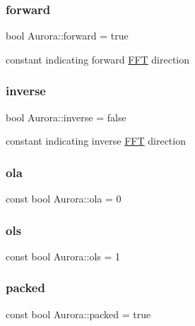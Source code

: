 \mbox{\label{namespace_aurora_a20b1bd3f1b34b8676e26d07718dac352}} 
\subsubsection{\texorpdfstring{forward}{forward}}
{\footnotesize\ttfamily bool Aurora\+::forward = true\hspace{0.3cm}{\ttfamily [static]}}

constant indicating forward \hyperlink{class_aurora_1_1_f_f_t}{F\+FT} direction \mbox{\label{namespace_aurora_ac22c4e2e10572cbb6f64f3bd1cd595b5}} 
\subsubsection{\texorpdfstring{inverse}{inverse}}
{\footnotesize\ttfamily bool Aurora\+::inverse = false\hspace{0.3cm}{\ttfamily [static]}}

constant indicating inverse \hyperlink{class_aurora_1_1_f_f_t}{F\+FT} direction \mbox{\label{namespace_aurora_ab2cb0b1f6952bb2ca908ebd8156370db}} 
\subsubsection{\texorpdfstring{ola}{ola}}
{\footnotesize\ttfamily const bool Aurora\+::ola = 0}

\mbox{\label{namespace_aurora_a4e816792565225ccd6ba67110f75fb8b}} 
\subsubsection{\texorpdfstring{ols}{ols}}
{\footnotesize\ttfamily const bool Aurora\+::ols = 1}

\mbox{\label{namespace_aurora_a3e70ffc9ea5c526dcd66b1b14e43f175}} 
\subsubsection{\texorpdfstring{packed}{packed}}
{\footnotesize\ttfamily const bool Aurora\+::packed = true}

